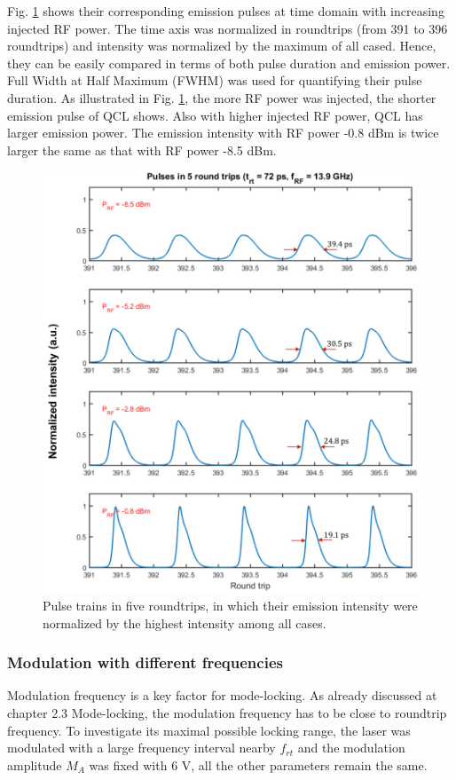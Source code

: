 \documentclass[11pt,final]{scrbook}
\begin{document}
Fig. \ref{fig:Pulse_modA} shows their corresponding emission pulses at time domain with increasing injected RF power. The time axis was normalized in roundtrips (from 391 to 396 roundtrips) and intensity was normalized by the maximum of all cased. Hence, they can be easily compared in terms of both pulse duration and emission power. Full Width at Half Maximum (FWHM) was used for quantifying their pulse duration. As illustrated in Fig. \ref{fig:Pulse_modA}, the more RF power was injected, the shorter emission pulse of QCL shows. Also with higher injected RF power, QCL has larger emission power. The emission intensity with RF power -0.8 dBm is twice larger the same as that with RF power -8.5 dBm.
\begin{figure}[htbp]
\begin{center}
\includegraphics[scale=0.5]{images/Pulse_modA.pdf}
\caption{Pulse trains in five roundtrips, in which their emission intensity were normalized by the highest intensity among all cases.}
\label{fig:Pulse_modA}
\end{center}
\end{figure}

\subsubsection{Modulation with different frequencies} 
Modulation frequency is a key factor for mode-locking. As already discussed at chapter 2.3 Mode-locking, the modulation frequency has to be close to roundtrip frequency. To investigate its maximal possible locking range, the laser was modulated with a large frequency interval nearby $f_{rt}$ and the modulation amplitude $M_{A}$ was fixed with 6 V, all the other parameters remain the same.
\end{document}
